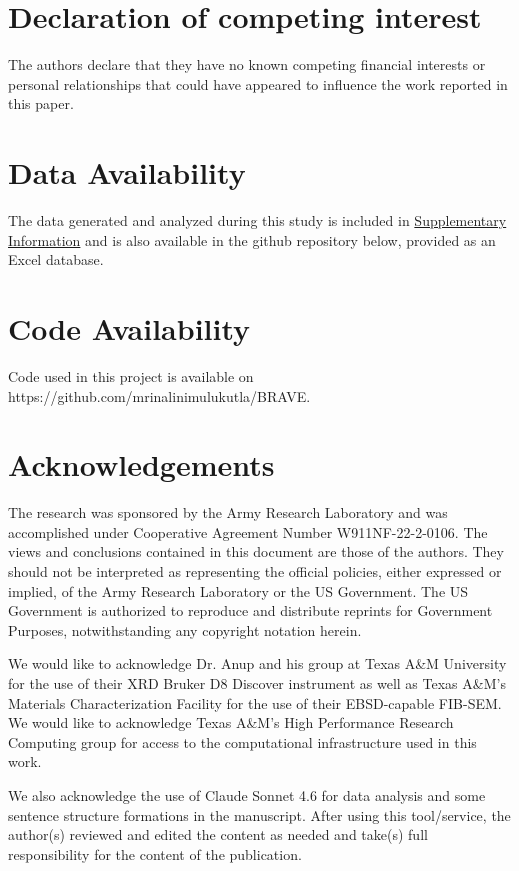 \documentclass[final,5p,times,twocolumn]{elsarticle}
\begin{document}









\section*{Declaration of competing interest}

    The authors declare that they have no known competing financial interests or personal relationships that could have appeared to influence the work reported in this paper.

\section*{Data Availability}

    The data generated and analyzed during this study is included in \underline{Supplementary Information} and is also available in the github repository below, provided as an Excel database.

\section*{Code Availability}

    Code used in this project is available on https://github.com/mrinalinimulukutla/BRAVE.

\section{Acknowledgements}

The research was sponsored by the Army Research Laboratory and was accomplished under Cooperative Agreement Number W911NF-22-2-0106. The views and conclusions contained in this document are those of the authors. They should not be interpreted as representing the official policies, either expressed or implied, of the Army Research Laboratory or the US Government. The US Government is authorized to reproduce and distribute reprints for Government Purposes, notwithstanding any copyright notation herein. 
    
We would like to acknowledge Dr. Anup and his group at Texas A\&M University for the use of their XRD Bruker D8 Discover instrument as well as Texas A\&M’s Materials Characterization Facility for the use of their EBSD-capable FIB-SEM. We would like to acknowledge Texas A\&M’s High Performance Research Computing group for access to the computational infrastructure used in this work.

We also acknowledge the use of Claude Sonnet 4.6 for data analysis and some sentence structure formations in the manuscript. After using this tool/service, the author(s) reviewed and edited the content as needed and take(s) full responsibility for the content of the publication.  

%




\end{document}
